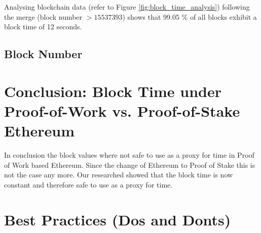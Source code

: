 Analysing blockchain data (refer to Figure \ref{fig:block_time_analysis}) following the
merge (block number $> 15537393$) shows that 99.05 \% of all blocks exhibit a
block time of 12 seconds.

\subsection{Block Number}


\section{Conclusion: Block Time under Proof-of-Work vs. Proof-of-Stake Ethereum}
In conclusion the block values where not safe to use as a proxy for time in 
Proof of Work based Ethereum. Since the change of Ethereum to Proof of Stake this is not the case any more.
Our researched showed that the block time is now constant and therefore safe to use as a proxy for time.

\section{Best Practices (Dos and Donts)}

